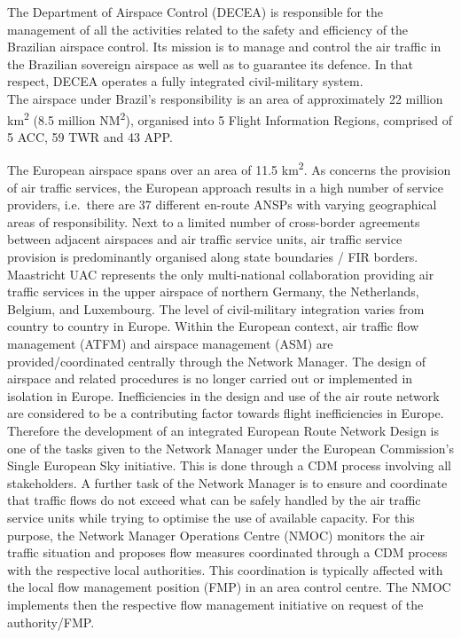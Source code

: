 \documentclass[
]{book}
\begin{document}
The Department of Airspace Control (DECEA) is responsible for the management of all the activities related to the safety and efficiency of the Brazilian airspace control.
Its mission is to manage and control the air traffic in the Brazilian sovereign airspace as well as to guarantee its defence.
In that respect, DECEA operates a fully integrated civil-military system.\\
The airspace under Brazil's responsibility is an area of approximately 22 million km\textsuperscript{2} (8.5 million NM\textsuperscript{2}), organised into 5 Flight Information Regions, comprised of 5 ACC, 59 TWR and 43 APP.

The European airspace spans over an area of 11.5 km\textsuperscript{2}.
As concerns the provision of air traffic services, the European approach results in a high number of service providers, i.e.~there are 37 different en-route ANSPs with varying geographical areas of responsibility.
Next to a limited number of cross-border agreements between adjacent airspaces and air traffic service units, air traffic service provision is predominantly organised along state boundaries / FIR borders. Maastricht UAC represents the only multi-national collaboration providing air traffic services in the upper airspace of northern Germany, the Netherlands, Belgium, and Luxembourg. The level of civil-military integration varies from country to country in Europe.
Within the European context, air traffic flow management (ATFM) and airspace management (ASM) are provided/coordinated centrally through the Network Manager.
The design of airspace and related procedures is no longer carried out or implemented in isolation in Europe.
Inefficiencies in the design and use of the air route network are considered to be a contributing factor towards flight inefficiencies in Europe.
Therefore the development of an integrated European Route Network Design is one of the tasks given to the Network Manager under the European Commission's Single European Sky initiative. This is done through a CDM process involving all stakeholders.
A further task of the Network Manager is to ensure and coordinate that traffic flows do not exceed what can be safely handled by the air traffic service units while trying to optimise the use of available capacity.
For this purpose, the Network Manager Operations Centre (NMOC) monitors the air traffic situation and proposes flow measures coordinated through a CDM process with the respective local authorities.
This coordination is typically affected with the local flow management position (FMP) in an area control centre.
The NMOC implements then the respective flow management initiative on request of the authority/FMP.
\end{document}

